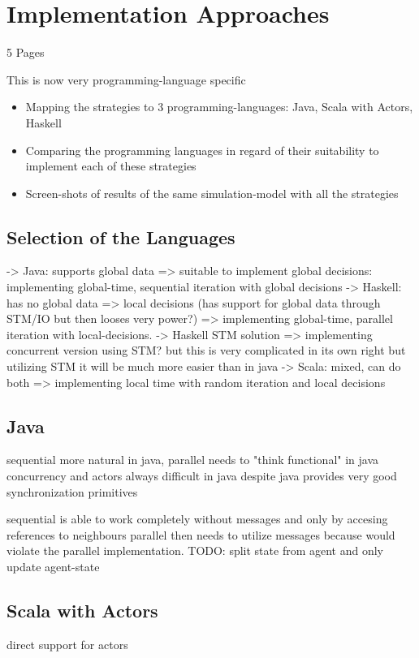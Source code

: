 \section{Implementation Approaches}
5 Pages

This is now very programming-language specific

\begin{itemize}
	\item Mapping the strategies to 3 programming-languages: Java, Scala with Actors, Haskell
	\item Comparing the programming languages in regard of their suitability to implement each of these strategies
	\item Screen-shots of results of the same simulation-model with all the strategies
\end{itemize}

\subsection{Selection of the Languages}
-> Java: supports global data => suitable to implement global decisions: implementing global-time, sequential iteration with global decisions
	-> Haskell: has no global data => local decisions (has support for global data through STM/IO but then looses very power?) => implementing global-time, parallel iteration with local-decisions. 
		-> Haskell STM solution => implementing concurrent version using STM? but this is very complicated in its own right but utilizing STM it will be much more easier than in java
	-> Scala: mixed, can do both => implementing local time with random iteration and local decisions


\subsection{Java}
sequential more natural in java,
parallel needs to "think functional" in java
concurrency and actors always difficult in java despite java provides very good synchronization primitives

sequential is able to work completely without messages and only by accesing references to neighbours
parallel then needs to utilize messages because would violate the parallel implementation. TODO: split state from agent and only update agent-state

\subsection{Scala with Actors}
direct support for actors

